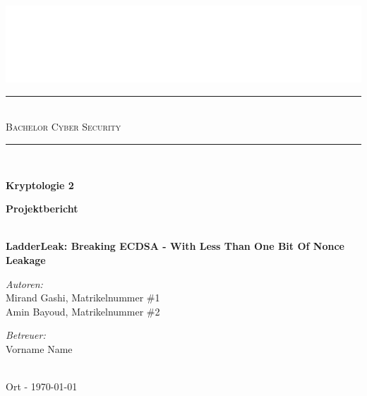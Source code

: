 \documentclass{article}
\begin{document}

\begin{titlepage}
	\begin{center}
		
        \includegraphics[width=\textwidth]{THD-Logo.pdf}
	
	    \vspace{1cm}
	
		\rule{1\textwidth}{1mm} \\[0.3cm]

		\textsc{\scshape \huge Bachelor Cyber Security}\\
		
		\rule{1\textwidth}{1mm} \\[2cm] 
		
		{ %
			 \vspace{1cm}
			 
			 \Large \textbf{Kryptologie 2}
			 
			 \vspace{3cm}
			 \Large \textbf{Projektbericht}}\\[0.5cm]
			 \LARGE \textbf{LadderLeak: Breaking ECDSA - With Less Than One Bit
Of Nonce Leakage}\\[2cm]
		\begin{minipage}[t]{0.4\textwidth}
			\begin{flushleft} \normalsize
				\emph{Autoren:}\\[0.3cm]
				
			    Mirand Gashi, Matrikelnummer \#1\\
			   Amin Bayoud, Matrikelnummer \#2\\
				
			\end{flushleft}
		\end{minipage}
		\begin{minipage}[t]{0.5\textwidth}
			\begin{flushright} \normalsize
				\emph{Betreuer:}\\[0.3cm]
				
    			Vorname Name 
				
			\end{flushright}
		\end{minipage}\\[3cm]
		{\large Ort - \today\\}	
		\vspace{3cm}
	\end{center}
\end{titlepage}
\end{document}
